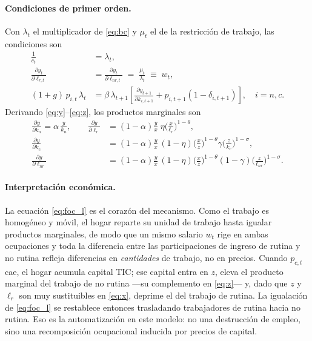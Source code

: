 \documentclass[12pt,letterpaper]{article}
\newcommand{\lr}{\ell_{r}}
\newcommand{\lnr}{\ell_{nr}}
\newcommand{\lrt}{\ell_{r,t}}
\newcommand{\lnrt}{\ell_{nr,t}}
\begin{document}
\paragraph{Condiciones de primer orden.}
Con $\lambda_t$ el multiplicador de \eqref{eq:bc} y $\mu_t$ el de la restricción de
trabajo, las condiciones son
\begin{align}
\frac{1}{c_{t}} &= \lambda_{t}, \label{eq:foc_c}\\
\frac{\partial y_{t}}{\partial \lrt} &= \frac{\partial y_{t}}{\partial \lnrt}
\;=\; \frac{\mu_{t}}{\lambda_{t}} \;\equiv\; w_{t}, \label{eq:foc_l}\\
(1+g)\,p_{i,t}\,\lambda_{t} &= \beta\,\lambda_{t+1}
\left[\frac{\partial y_{t+1}}{\partial k_{i,t+1}} + p_{i,t+1}(1-\delta_{i,t+1})\right],
\quad i=n,c. \label{eq:euler}
\end{align}
Derivando \eqref{eq:y}--\eqref{eq:z}, los productos marginales son
\begin{align}
\frac{\partial y}{\partial k_{n}} = \alpha\,\frac{y}{k_{n}},
\qquad
\frac{\partial y}{\partial \lr} &= (1-\alpha)\frac{y}{x}\;\eta\Big(\frac{x}{\lr}\Big)^{1-\theta},\\
\frac{\partial y}{\partial k_{c}} &= (1-\alpha)\frac{y}{x}\,(1-\eta)\Big(\frac{x}{z}\Big)^{1-\theta}\gamma\Big(\frac{z}{k_{c}}\Big)^{1-\sigma},\\
\frac{\partial y}{\partial \lnr} &= (1-\alpha)\frac{y}{x}\,(1-\eta)\Big(\frac{x}{z}\Big)^{1-\theta}(1-\gamma)\Big(\frac{z}{\lnr}\Big)^{1-\sigma}.
\end{align}

\paragraph{Interpretación económica.}
La ecuación \eqref{eq:foc_l} es el corazón del mecanismo. Como el trabajo es homogéneo
y móvil, el hogar reparte su unidad de trabajo hasta igualar productos marginales, de
modo que un mismo salario $w_t$ rige en ambas ocupaciones y toda la diferencia entre
las participaciones de ingreso de rutina y no rutina refleja diferencias en
\emph{cantidades} de trabajo, no en precios. Cuando $p_{c,t}$ cae, el hogar acumula
capital TIC; ese capital entra en $z$, eleva el producto marginal del trabajo de no
rutina —su complemento en \eqref{eq:z}— y, dado que $z$ y $\lr$ son muy sustituibles
en \eqref{eq:x}, deprime el del trabajo de rutina. La igualación de \eqref{eq:foc_l}
se restablece entonces trasladando trabajadores de rutina hacia no rutina. Eso es la
automatización en este modelo: no una destrucción de empleo, sino una recomposición
ocupacional inducida por precios de capital.
\end{document}
